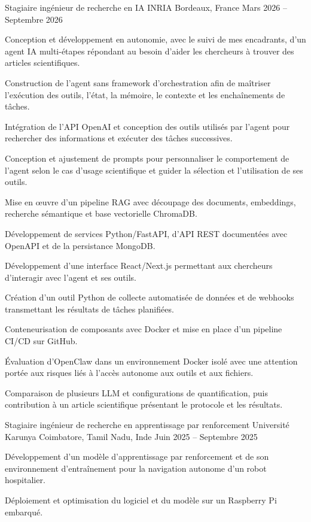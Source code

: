 
\begin{cventries}
  \cventry
    {Stagiaire ingénieur de recherche en IA}
    {INRIA}
    {Bordeaux, France}
    {Mars 2026 -- Septembre 2026}
    {
      \begin{cvitems}
        \item {Conception et développement en autonomie, avec le suivi de mes encadrants, d’un agent IA multi-étapes répondant au besoin d’aider les chercheurs à trouver des articles scientifiques.}
        \item {Construction de l’agent sans framework d’orchestration afin de maîtriser l’exécution des outils, l’état, la mémoire, le contexte et les enchaînements de tâches.}
        \item {Intégration de l’API OpenAI et conception des outils utilisés par l’agent pour rechercher des informations et exécuter des tâches successives.}
        \item {Conception et ajustement de prompts pour personnaliser le comportement de l’agent selon le cas d’usage scientifique et guider la sélection et l’utilisation de ses outils.}
        \item {Mise en œuvre d’un pipeline RAG avec découpage des documents, embeddings, recherche sémantique et base vectorielle ChromaDB.}
        \item {Développement de services Python/FastAPI, d’API REST documentées avec OpenAPI et de la persistance MongoDB.}
        \item {Développement d’une interface React/Next.js permettant aux chercheurs d’interagir avec l’agent et ses outils.}
        \item {Création d’un outil Python de collecte automatisée de données et de webhooks transmettant les résultats de tâches planifiées.}
        \item {Conteneurisation de composants avec Docker et mise en place d’un pipeline CI/CD sur GitHub.}
        \item {Évaluation d’OpenClaw dans un environnement Docker isolé avec une attention portée aux risques liés à l’accès autonome aux outils et aux fichiers.}
        \item {Comparaison de plusieurs LLM et configurations de quantification, puis contribution à un article scientifique présentant le protocole et les résultats.}
      \end{cvitems}
    }

  \cventry
    {Stagiaire ingénieur de recherche en apprentissage par renforcement}
    {Université Karunya}
    {Coimbatore, Tamil Nadu, Inde}
    {Juin 2025 -- Septembre 2025}
    {
      \begin{cvitems}
        \item {Développement d’un modèle d’apprentissage par renforcement et de son environnement d’entraînement pour la navigation autonome d’un robot hospitalier.}
        \item {Déploiement et optimisation du logiciel et du modèle sur un Raspberry Pi embarqué.}
      \end{cvitems}
    }
\end{cventries}
